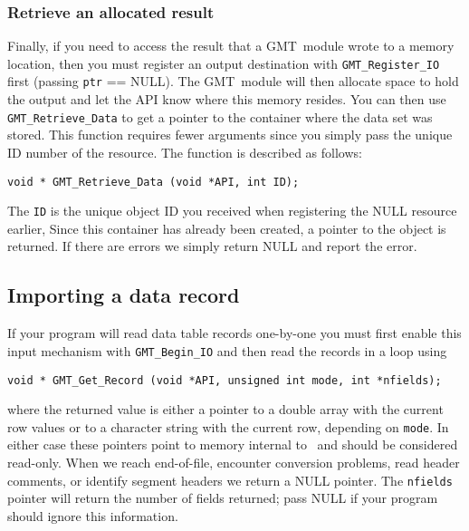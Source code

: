 \documentclass[11pt]{report}
\begin{document}
\subsubsection{Retrieve an allocated result}

Finally, if you need to access the result that a GMT\ module wrote to a memory location,
then you must register an output destination with \texttt{GMT\_Register\_IO} first (passing \texttt{ptr} == NULL).
The GMT\ module will then allocate space to hold the output and let the API know where this memory resides.
You can then use \texttt{GMT\_Retrieve\_Data} to get a pointer to the container where the data set was stored.
This function requires fewer arguments since you simply
pass the unique ID number of the resource.  The function is described as follows:


\begin{verbatim}
void * GMT_Retrieve_Data (void *API, int ID);
\end{verbatim}
The \texttt{ID} is the unique object ID you received when registering the NULL resource earlier,
Since this container has already been created, a pointer to the object is returned.
If there are errors we simply return NULL and report the error.

\subsection{Importing a data record}

If your program will read data table records one-by-one you must first
enable this input mechanism with \texttt{GMT\_Begin\_IO} and then read
the records in a loop using

\begin{verbatim}
void * GMT_Get_Record (void *API, unsigned int mode, int *nfields);
\end{verbatim}
where the returned value is either a pointer to a double array with the current row values
or to a character string with the current row, depending on \texttt{mode}.
In either case these pointers point to memory internal to \GMT\ and should be considered read-only.
When we reach end-of-file, encounter conversion problems, read header comments, or identify
segment headers we return a NULL pointer.
The \texttt{nfields} pointer will return the number of fields returned; pass NULL if your program
should ignore this information.
\end{document}
